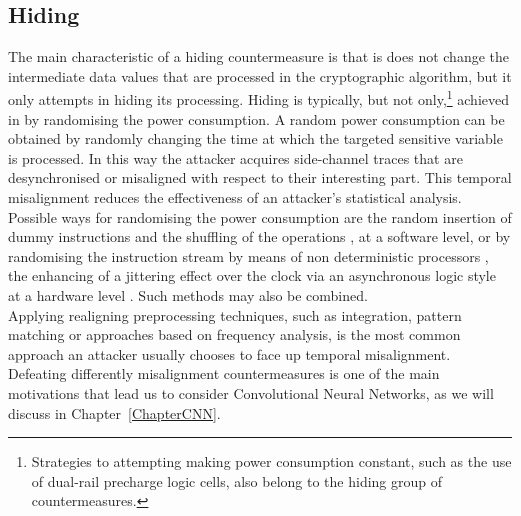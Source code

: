 \subsection{Hiding}
The main characteristic of a hiding countermeasure is that is does not change the intermediate data values that are processed in the cryptographic algorithm, but it only attempts in hiding its processing. Hiding is typically, but not only,\footnote{Strategies to attempting making power consumption constant, such as the use of dual-rail precharge logic cells, also belong to the hiding group of countermeasures.} achieved in by randomising the power consumption. A random power consumption can be obtained by randomly changing the time at which the targeted sensitive variable is processed. In this way the attacker acquires side-channel traces that are desynchronised or misaligned with respect to their interesting part. This temporal misalignment reduces the effectiveness of an attacker’s statistical analysis. Possible ways for randomising the power consumption are the random insertion of dummy instructions \cite{coron2009efficient,coron2010analysis} and the shuffling of the operations \cite{veyrat2012shuffling}, at a software level, or by randomising the instruction stream by means of non deterministic processors \cite{irwin2002instruction,may2001non}, the enhancing of a jittering effect over the clock via an asynchronous logic style at a hardware level \cite{moore2002improving,moore2003balanced}. Such methods may also be combined. \\

Applying realigning preprocessing techniques, such as integration, pattern matching or approaches based on frequency analysis, is the most common approach an attacker usually chooses to face up temporal misalignment. Defeating differently misalignment countermeasures is one of the main motivations that lead us to consider Convolutional Neural Networks, as we will discuss in Chapter~\ref{ChapterCNN}.

